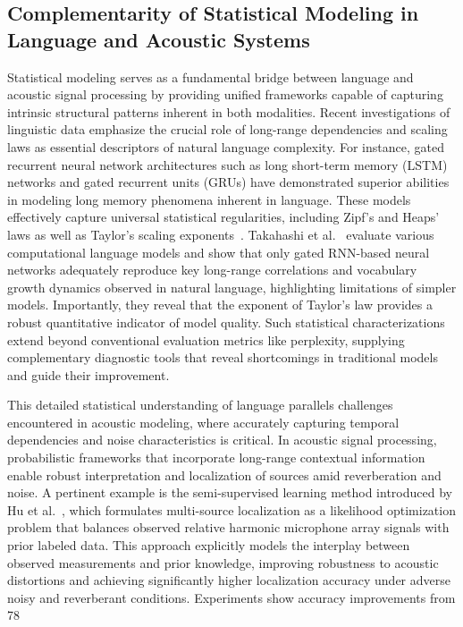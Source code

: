 \documentclass[sigconf]{acmart}
\begin{document}
\subsection{Complementarity of Statistical Modeling in Language and Acoustic Systems}

Statistical modeling serves as a fundamental bridge between language and acoustic signal processing by providing unified frameworks capable of capturing intrinsic structural patterns inherent in both modalities. Recent investigations of linguistic data emphasize the crucial role of long-range dependencies and scaling laws as essential descriptors of natural language complexity. For instance, gated recurrent neural network architectures such as long short-term memory (LSTM) networks and gated recurrent units (GRUs) have demonstrated superior abilities in modeling long memory phenomena inherent in language. These models effectively capture universal statistical regularities, including Zipf’s and Heaps’ laws as well as Taylor’s scaling exponents~\cite{ref51}. Takahashi et al.~\cite{ref51} evaluate various computational language models and show that only gated RNN-based neural networks adequately reproduce key long-range correlations and vocabulary growth dynamics observed in natural language, highlighting limitations of simpler models. Importantly, they reveal that the exponent of Taylor’s law provides a robust quantitative indicator of model quality. Such statistical characterizations extend beyond conventional evaluation metrics like perplexity, supplying complementary diagnostic tools that reveal shortcomings in traditional models and guide their improvement.

This detailed statistical understanding of language parallels challenges encountered in acoustic modeling, where accurately capturing temporal dependencies and noise characteristics is critical. In acoustic signal processing, probabilistic frameworks that incorporate long-range contextual information enable robust interpretation and localization of sources amid reverberation and noise. A pertinent example is the semi-supervised learning method introduced by Hu et al.~\cite{ref52}, which formulates multi-source localization as a likelihood optimization problem that balances observed relative harmonic microphone array signals with prior labeled data. This approach explicitly models the interplay between observed measurements and prior knowledge, improving robustness to acoustic distortions and achieving significantly higher localization accuracy under adverse noisy and reverberant conditions. Experiments show accuracy improvements from 78%
\end{document}
